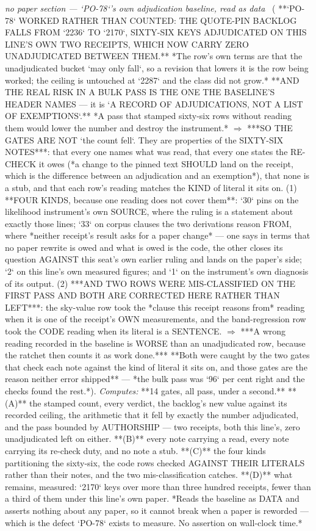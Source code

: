 \begin{description}
\textit{no paper section --- `PO-78`'s own adjudication baseline, read as data} \ ( **`PO-78` WORKED RATHER THAN COUNTED: THE QUOTE-PIN BACKLOG FALLS FROM `2236` TO `2170`, SIXTY-SIX KEYS ADJUDICATED ON THIS LINE'S OWN TWO RECEIPTS, WHICH NOW CARRY ZERO UNADJUDICATED BETWEEN THEM.** *The row's own terms are that the unadjudicated bucket `may only fall`, so a revision that lowers it is the row being worked; the ceiling is untouched at `2287` and the class did not grow.*  **AND THE REAL RISK IN A BULK PASS IS THE ONE THE BASELINE'S HEADER NAMES --- it is `A RECORD OF ADJUDICATIONS, NOT A LIST OF EXEMPTIONS`.** *A pass that stamped sixty-six rows without reading them would lower the number and destroy the instrument.* \ensuremath{\Rightarrow} ***SO THE GATES ARE NOT `the count fell`. They are properties of the SIXTY-SIX NOTES***: that every one names what was read, that every one states the RE-CHECK it owes (*a change to the pinned text SHOULD land on the receipt, which is the difference between an adjudication and an exemption*), that none is a stub, and that each row's reading matches the KIND of literal it sits on. (1) **FOUR KINDS, because one reading does not cover them**: `30` pins on the likelihood instrument's own SOURCE, where the ruling is a statement about exactly those lines; `33` on corpus clauses the two derivations reason FROM, where *neither receipt's result asks for a paper change* --- one says in terms that no paper rewrite is owed and what is owed is the code, the other closes its question AGAINST this seat's own earlier ruling and lands on the paper's side; `2` on this line's own measured figures; and `1` on the instrument's own diagnosis of its output.  (2) ***AND TWO ROWS WERE MIS-CLASSIFIED ON THE FIRST PASS AND BOTH ARE CORRECTED HERE RATHER THAN LEFT***: the sky-value row took the *clause this receipt reasons from* reading when it is one of the receipt's OWN measurements, and the band-regression row took the CODE reading when its literal is a SENTENCE. \ensuremath{\Rightarrow} ***A wrong reading recorded in the baseline is WORSE than an unadjudicated row, because the ratchet then counts it as work done.*** **Both were caught by the two gates that check each note against the kind of literal it sits on, and those gates are the reason neither error shipped** --- *the bulk pass was `96` per cent right and the checks found the rest.*). 
\emph{Computes:} **14 gates, all pass, under a second.** **(A)** the stamped count, every verdict, the backlog's new value against its recorded ceiling, the arithmetic that it fell by exactly the number adjudicated, and the pass bounded by AUTHORSHIP --- two receipts, both this line's, zero unadjudicated left on either. **(B)** every note carrying a read, every note carrying its re-check duty, and no note a stub. **(C)** the four kinds partitioning the sixty-six, the code rows checked AGAINST THEIR LITERALS rather than their notes, and the two mis-classification catches. **(D)** what remains, measured: `2170` keys over more than three hundred receipts, fewer than a third of them under this line's own paper. *Reads the baseline as DATA and asserts nothing about any paper, so it cannot break when a paper is reworded --- which is the defect `PO-78` exists to measure. No assertion on wall-clock time.*

\end{description}
